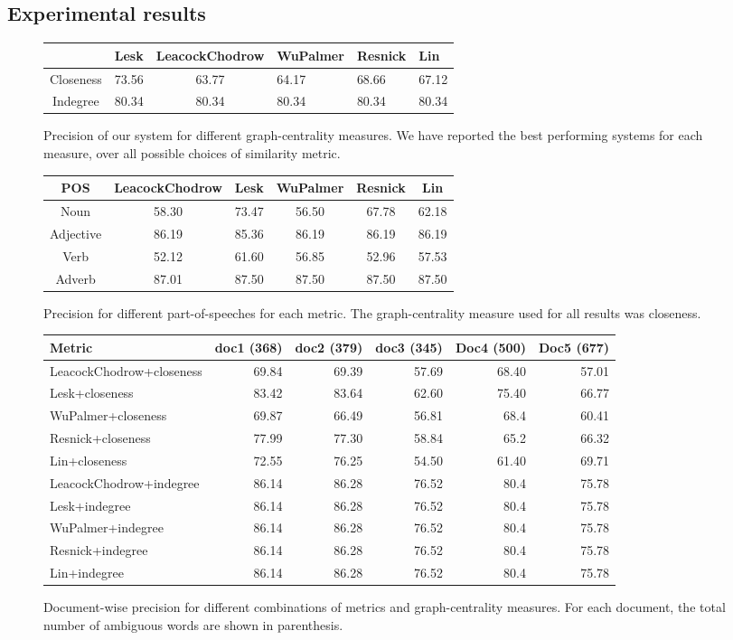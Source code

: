 \documentclass[12pt,letterpaper]{article}
\begin{document}
\subsection{Experimental results}
\label{sec:experimental-results}
\begin{figure}
\centering
\begin{minipage}{.5\linewidth}
\begin{tabular}{|c|c|c|}
  & Lesk & LeacockChodrow & WuPalmer & Resnick & Lin  \\
\hline
Closeness & 73.56 & 63.77 & 64.17 & 68.66 & 67.12\\
Indegree & 80.34 & 80.34 & 80.34 & 80.34 & 80.34 \\
\end{tabular}
\caption{Precision of our system for different graph-centrality measures. We have reported the best performing systems for each measure, over all possible choices of similarity metric.}
\end{minipage}
\quad
\begin{tabular}{|c|c|c|c|c|c|}
POS & LeacockChodrow & Lesk & WuPalmer & Resnick & Lin  \\
\hline
Noun & 58.30 & 73.47 & 56.50& 67.78 & 62.18\\
Adjective & 86.19 & 85.36 & 86.19 & 86.19 & 86.19\\
Verb & 52.12 & 61.60 & 56.85 & 52.96 & 57.53\\
Adverb & 87.01 & 87.50 & 87.50 & 87.50 & 87.50\\
\end{tabular}
\caption{Precision for different part-of-speeches for each metric. The graph-centrality measure used for all results was closeness.}
\end{figure}
\begin{figure}
\begin{tabular}{|l|r|r|r|r|r|}
Metric & doc1 (368) & doc2 (379) & doc3 (345) & Doc4 (500) & Doc5 (677) \\
\hline
LeacockChodrow+closeness & 69.84 & 69.39 & 57.69 & 68.40 & 57.01 \\
Lesk+closeness & 83.42 & 83.64 & 62.60 & 75.40 & 66.77 \\
WuPalmer+closeness & 69.87 & 66.49 & 56.81 & 68.4 & 60.41 \\
Resnick+closeness & 77.99 & 77.30 & 58.84 & 65.2 & 66.32 \\
Lin+closeness & 72.55 & 76.25 & 54.50 & 61.40 & 69.71 \\
LeacockChodrow+indegree & 86.14 & 86.28 & 76.52 & 80.4 & 75.78 \\
Lesk+indegree & 86.14 & 86.28 & 76.52 & 80.4 & 75.78 \\
WuPalmer+indegree & 86.14 & 86.28 & 76.52 & 80.4 & 75.78 \\
Resnick+indegree & 86.14 & 86.28 & 76.52 & 80.4 & 75.78 \\
Lin+indegree & 86.14 & 86.28 & 76.52 & 80.4 & 75.78 \\
\end{tabular}
\caption{Document-wise precision for different combinations of metrics and graph-centrality measures. For each document, the total number of ambiguous words are shown in parenthesis.}
\end{figure}
\end{document}
